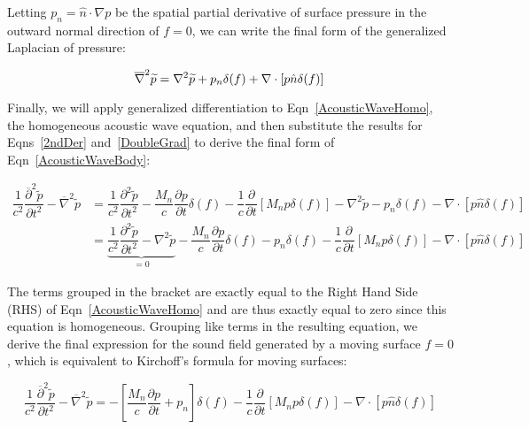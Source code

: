 \documentclass[]{aiaa-tc}%
\begin{document}
\noindent Letting $p_n = \hat{n}\cdot\nabla p$ be the spatial partial derivative of surface pressure in the outward normal direction of $f=0$, we can write the final form of the generalized Laplacian of pressure:

\begin{equation} \label{DoubleGrad}
\overline{\nabla}^2 \widetilde{p}
    = \nabla^2\widetilde{p} + p_n \delta(f)
    + \nabla\cdot \left[ p\hat{n} \delta(f) \right] \\
\end{equation}

Finally, we will apply generalized differentiation to Eqn~\ref{AcousticWaveHomo}, the homogeneous acoustic wave equation, and then substitute the results for Eqns~\ref{2ndDer} and~\ref{DoubleGrad} to derive the final form of Eqn~\ref{AcousticWaveBody}:

\begin{align*}
\dfrac{1}{c^2}\dfrac{\overline{\partial}^2 \widetilde{p}}{\partial t^2}
    - \overline{\nabla}^2 \widetilde{p}
&= \dfrac{1}{c^2} \dfrac{\partial^2\widetilde{p}}{\partial t^2}
    - \dfrac{M_n}{c} \dfrac{\partial p}{\partial t}  \delta(f)
    - \dfrac{1}{c}\dfrac{\partial}{\partial t} \left[ M_n p\delta(f) \right]
    -\nabla^2\widetilde{p} - p_n \delta(f)
    - \nabla\cdot \left[ p\hat{n} \delta(f) \right] \\
&= \underbrace{\dfrac{1}{c^2} \dfrac{\partial^2\widetilde{p}}{\partial t^2}
    -\nabla^2\widetilde{p}}_{=0}
    - \dfrac{M_n}{c} \dfrac{\partial p}{\partial t}  \delta(f)
    - p_n \delta(f)
    - \dfrac{1}{c}\dfrac{\partial}{\partial t} \left[ M_n p\delta(f) \right]
    - \nabla\cdot \left[ p\hat{n} \delta(f) \right]
\end{align*}

The terms grouped in the bracket are exactly equal to the Right Hand Side (RHS) of Eqn~\ref{AcousticWaveHomo} and are thus exactly equal to zero since this equation is homogeneous.  Grouping like terms in the resulting equation, we derive the final expression for the sound field generated by a moving surface $f=0$, which is equivalent to Kirchoff's formula for moving surfaces:

\begin{equation}
\boxed{\dfrac{1}{c^2}\dfrac{\overline{\partial}^2 \widetilde{p}}{\partial t^2}
    - \overline{\nabla}^2 \widetilde{p}
= -\left[\dfrac{M_n}{c} \dfrac{\partial p}{\partial t} + p_n  \right] \delta(f)
    - \dfrac{1}{c}\dfrac{\partial}{\partial t} \left[ M_n p\delta(f) \right]
    - \nabla\cdot \left[ p\hat{n} \delta(f) \right]}
\end{equation}
\end{document}
